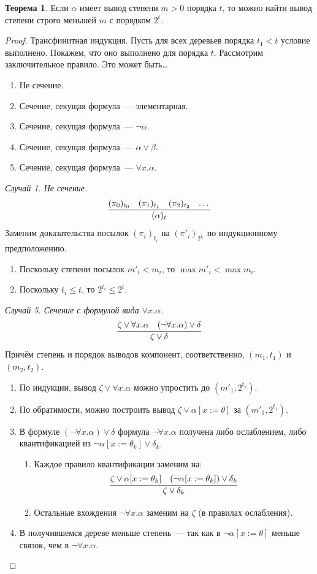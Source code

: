 \documentclass[a4paper,11pt]{article}
\theoremstyle{definition}
\newtheorem*{thm}{Теорема}
\begin{document}
\begin{thm}
Если $\alpha$ имеет вывод степени $m > 0$ порядка $t$, то можно найти вывод
степени строго меньшей $m$ с порядком $2^t$.
\end{thm}
\begin{proof}
Трансфинитная индукция. Пусть для всех деревьев порядка $t_1 < t$ условие
выполнено. Покажем, что оно выполнено для порядка $t$. Рассмотрим заключительное
правило. Это может быть\dots
\begin{enumerate}
\item Не сечение.
\item Сечение, секущая формула~--- элементарная.
\item Сечение, секущая формула~--- $\neg\alpha$.
\item Сечение, секущая формула~--- $\alpha \vee \beta$.
\item Сечение, секущая формула~--- $\forall x.\alpha$.
\end{enumerate}

\emph{Случай 1. Не сечение.}
\[
\infer{(\alpha)_t}{(\pi_0)_{t_0} & (\pi_1)_{t_1} & (\pi_2)_{t_2} & \dots}
\]
Заменим доказательства посылок $(\pi_i)_{t_i}$ на $(\pi'_i)_{2^{t_i}}$ по
индукционному предположению.
\begin{enumerate}
\item Поскольку степени посылок $m'_i < m_i$, то $\max m'_i < \max m_i$.
\item Поскольку $t_i \le t$, то $2^{t_i} \le 2^t$.
\end{enumerate}

\emph{Случай 5. Сечение с формулой вида $\forall x.\alpha$.}
\[
\infer{\zeta \vee \delta}{\zeta \vee \forall x.\alpha & (\neg\forall x.\alpha) \vee \delta}
\]
Причём степень и порядок выводов компонент, соответственно, $(m_1, t_1)$ и
$(m_2, t_2)$.
\begin{enumerate}
\item По индукции, вывод $\zeta \vee \forall x.\alpha$ можно упростить до
  $(m'_1, 2^{t_1})$.
\item По обратимости, можно построить вывод $\zeta \vee \alpha[x := \theta]$ за
  $(m'_1, 2^{t_1})$.
\item В формуле $(\neg\forall x.\alpha) \vee \delta$ формула $\neg\forall
  x.\alpha$ получена либо ослаблением, либо квантификацией из
  $\neg\alpha[x := \theta_k] \vee \delta_k$.
  \begin{enumerate}
  \item Каждое правило квантификации заменим на:
    \[
    \infer{\zeta \vee \delta_k}{\zeta \vee \alpha[x := \theta_k] & (\neg\alpha[x := \theta_k]) \vee \delta_k}
    \]
  \item Остальные вхождения $\neg\forall x.\alpha$ заменим на $\zeta$ (в
    правилах ослабления).
  \end{enumerate}
\item В получившемся дереве меньше степень~--- так как в $\neg\alpha[x :=
  \theta]$ меньше связок, чем в $\neg\forall x.\alpha$.
\end{enumerate}
\end{proof}
\end{document}
